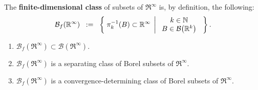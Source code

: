 \begin{definition}
\label{RInfinityFiniteDimensionalClass}
\mbox{}\vskip 0.1cm
\noindent
The \textbf{finite-dimensional class} of subsets
of $\Re^{\infty}$ is, by definition, the following:
\begin{equation*}
\mathcal{B}_{f}(\mathbb{R}^{\infty})
\;\; := \;\;
\left\{\;
\pi_{k}^{-1}\!\left(B\right) \subset \mathbb{R}^{\infty}
\;\left\vert\;
\begin{array}{c}
k \in \mathbb{N}
\\
B \in \mathcal{B}\!\left(\mathbb{R}^{k}\right)
\end{array}
\right.
\;\right\}.
\end{equation*}
\end{definition}

\begin{theorem}
\mbox{}
\begin{enumerate}
\item	$\mathcal{B}_{f}\!\left(\Re^{\infty}\right) \subset \mathcal{B}\!\left(\Re^{\infty}\right)$.
\item	$\mathcal{B}_{f}\!\left(\Re^{\infty}\right)$ is a separating class of Borel subsets of $\Re^{\infty}$.
\item	$\mathcal{B}_{f}\!\left(\Re^{\infty}\right)$ is a convergence-determining class of Borel subsets of $\Re^{\infty}$.
\end{enumerate}
\end{theorem}
